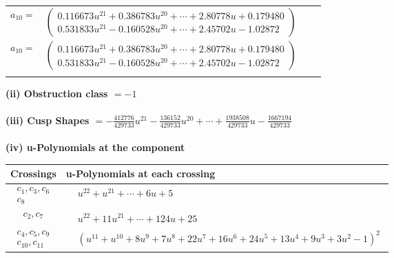 \documentclass[1p]{elsarticle_modified}
\theoremstyle{definition}
\begin{document}
\begin{tabular}{m{7pt} m{180pt} m{7pt} m{180pt} }
\flushright $a_{10}=$&$\begin{pmatrix}0.116673 u^{21}+0.386783 u^{20}+\cdots+2.80778 u+0.179480\\0.531833 u^{21}-0.160528 u^{20}+\cdots+2.45702 u-1.02872\end{pmatrix}$\\ \flushright $a_{10}=$&$\begin{pmatrix}0.116673 u^{21}+0.386783 u^{20}+\cdots+2.80778 u+0.179480\\0.531833 u^{21}-0.160528 u^{20}+\cdots+2.45702 u-1.02872\end{pmatrix}$\\&\end{tabular}
\flushleft \textbf{(ii) Obstruction class $= -1$}\\~\\
\flushleft \textbf{(iii) Cusp Shapes $= -\frac{412776}{429733} u^{21}-\frac{136152}{429733} u^{20}+\cdots+\frac{1938508}{429733} u-\frac{1667194}{429733}$}\\~\\
\newpage\renewcommand{\arraystretch}{1}
\flushleft \textbf{(iv) u-Polynomials at the component}\newline \\
\begin{tabular}{m{50pt}|m{274pt}}
Crossings & \hspace{64pt}u-Polynomials at each crossing \\
\hline $$\begin{aligned}c_{1},c_{3},c_{6}\\c_{8}\end{aligned}$$&$\begin{aligned}
&u^{22}+u^{21}+\cdots+6 u+5
\end{aligned}$\\
\hline $$\begin{aligned}c_{2},c_{7}\end{aligned}$$&$\begin{aligned}
&u^{22}+11 u^{21}+\cdots+124 u+25
\end{aligned}$\\
\hline $$\begin{aligned}c_{4},c_{5},c_{9}\\c_{10},c_{11}\end{aligned}$$&$\begin{aligned}
&(u^{11}+u^{10}+8 u^9+7 u^8+22 u^7+16 u^6+24 u^5+13 u^4+9 u^3+3 u^2-1)^2
\end{aligned}$\\
\hline
\end{tabular}\\~\\
\end{document}
